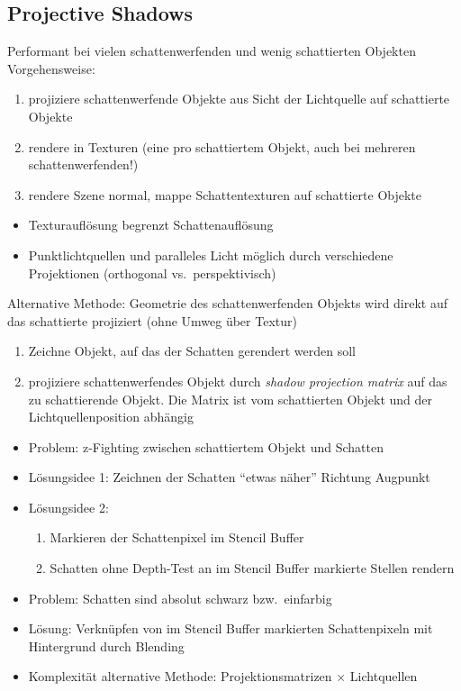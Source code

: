 \documentclass[a4paper, 12pt]{article}
\begin{document}
\subsection{Projective Shadows}
Performant bei vielen schattenwerfenden und wenig schattierten Objekten\\
Vorgehensweise:
\begin{enumerate}
  \item projiziere schattenwerfende Objekte aus Sicht der Lichtquelle auf schattierte Objekte
  \item rendere in Texturen (eine pro schattiertem Objekt, auch bei mehreren schattenwerfenden!)
  \item rendere Szene normal, mappe Schattentexturen auf schattierte Objekte
\end{enumerate}
\begin{itemize}
  \renewcommand{\labelitemi}{\(-\)}%
  \item Texturauflösung begrenzt Schattenauflösung
\end{itemize}
\begin{itemize}
  \renewcommand{\labelitemi}{+}%
  \item Punktlichtquellen und paralleles Licht möglich durch verschiedene Projektionen (orthogonal vs.\ perspektivisch)
\end{itemize}
Alternative Methode: Geometrie des schattenwerfenden Objekts wird direkt auf das schattierte projiziert (ohne Umweg über Textur)
\begin{enumerate}
  \item Zeichne Objekt, auf das der Schatten gerendert werden soll
  \item projiziere schattenwerfendes Objekt durch \emph{shadow projection matrix} auf das zu schattierende Objekt. Die Matrix ist vom schattierten Objekt und der Lichtquellenposition abhängig
\end{enumerate}
\begin{itemize}
  \item Problem: z-Fighting zwischen schattiertem Objekt und Schatten
  \item Lösungsidee 1: Zeichnen der Schatten ``etwas näher'' Richtung Augpunkt
  \item Lösungsidee 2:
    \begin{enumerate}
      \item Markieren der Schattenpixel im Stencil Buffer
      \item Schatten ohne Depth-Test an im Stencil Buffer markierte Stellen rendern
    \end{enumerate}
  \item Problem: Schatten sind absolut schwarz bzw.\ einfarbig
  \item Lösung: Verknüpfen von im Stencil Buffer markierten Schattenpixeln mit Hintergrund durch Blending
  \item Komplexität alternative Methode: Projektionsmatrizen \(\times\) Lichtquellen
\end{itemize}
\end{document}
